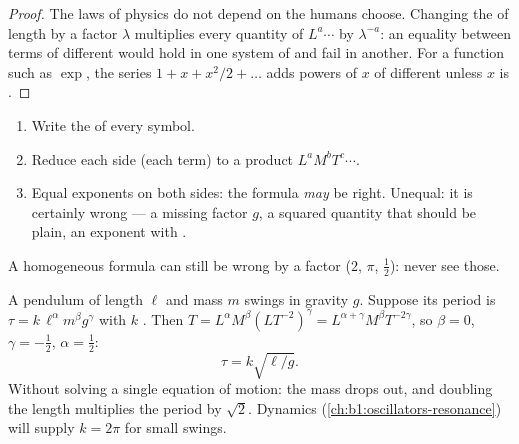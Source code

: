 \begin{proof}
The laws of physics do not depend on the  humans choose. Changing
the  of length by a factor $\lambda$ multiplies every quantity of
 $L^a \cdots$ by $\lambda^{-a}$: an equality between terms of
different  would hold in one system of  and fail in
another. For a function such as $\exp$, the series
$1 + x + x^2/2 + \dots$ adds powers of $x$ of different 
unless $x$ is .
\end{proof}

\begin{method}\label{met:b1:units-dimensions:check}
\begin{enumerate}
  \item Write the  of every symbol.
  \item Reduce each side (each term) to a product $L^a M^b T^c \cdots$.
  \item Equal exponents on both sides: the formula \emph{may} be right.
        Unequal: it is certainly wrong --- a missing factor $g$, a
        squared quantity that should be plain, an exponent with
        .
\end{enumerate}
A homogeneous formula can still be wrong by a  factor
($2$, $\pi$, $\tfrac12$):  never see those.
\end{method}

\begin{example}\label{ex:b1:units-dimensions:pendulum}
A pendulum of length $\ell$ and mass $m$ swings in gravity $g$. Suppose
its period is $\tau = k\,\ell^\alpha m^\beta g^\gamma$ with $k$
. Then $T = L^\alpha M^\beta (L T^{-2})^\gamma =
L^{\alpha+\gamma} M^\beta T^{-2\gamma}$, so $\beta = 0$,
$\gamma = -\tfrac12$, $\alpha = \tfrac12$:
\[
\tau = k\sqrt{\ell/g} .
\]
Without solving a single equation of motion: the mass drops out, and
doubling the length multiplies the period by $\sqrt2$. Dynamics
(\cref{ch:b1:oscillators-resonance}) will supply $k = 2\pi$ for small
swings.
\end{example}

